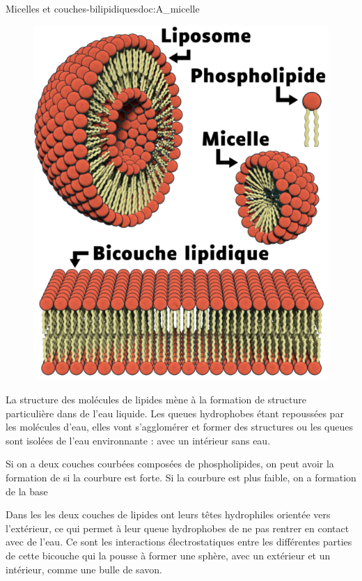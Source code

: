 \pasCorrection{\newpage \vspace*{-18pt}}
\begin{doc}{Micelles et couches-bilipidiques}{doc:A_micelle}
  \begin{figure}
    \centering
    \vspace*{-30pt}
    \includegraphics[width=0.95\linewidth]{images/molecules/biochimie/liposome_micelle_bicouche}
  \end{figure}

  La structure des molécules de lipides mène à la formation de structure particulière dans de l'eau liquide.
  Les queues hydrophobes étant repoussées par les molécules d'eau, elles vont s'agglomérer et former des structures ou les queues sont isolées de l'eau environnante :  avec un intérieur sans eau.
  \smallskip

  Si on a deux couches courbées composées de phospholipides,  on peut avoir la formation de  si la courbure est forte. Si la courbure est plus faible, on a formation de la base 
  \smallskip
  
  Dans les  les deux couches de lipides ont leurs têtes hydrophiles orientée vers l'extérieur, ce qui permet à leur queue hydrophobes de ne pas rentrer en contact avec de l'eau. 
  Ce sont les interactions électrostatiques entre les différentes parties de cette bicouche qui la pousse à former une sphère, avec un extérieur et un intérieur, comme une bulle de savon.
\end{doc}

